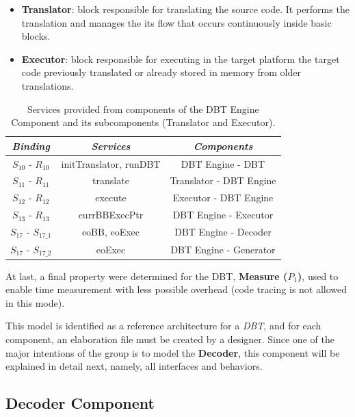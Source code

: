 \documentclass[12pt]{article}
\begin{document}
{\begin{itemize}
\begin{itemize}
\item \textbf{Translator}: block responsible for translating the source code. It performs the translation and manages the its flow that occurs continuously inside basic blocks. 
\item \textbf{Executor}: block responsible for executing in the target platform the target code previously translated or already stored in memory from older translations. 
\end{itemize}
\end{itemize}

\begin{table}[!htb]
\centering
\caption{Services provided from components of the DBT Engine Component and its subcomponents (Translator and Executor).}
\label{tab:dbtenginetable}
\begin{tabular}{|c|c|c|}
\hline
\textit{\textbf{Binding}}  & \textit{\textbf{Services}}    &  \textit{\textbf{Components}}    \\ \hline
$S_{10}$ - $R_{10}$   &  initTranslator, runDBT  & DBT Engine - DBT  \\ \hline
$S_{11}$ - $R_{11}$  & translate   & Translator - DBT Engine \\ \hline
$S_{12}$ - $R_{12}$  & execute   & Executor - DBT Engine \\ \hline
$S_{13}$ - $R_{13}$  & currBBExecPtr & DBT Engine - Executor
\\ \hline
$S_{17}$ - $S_{17\_1}$  & eoBB, eoExec & DBT Engine -  Decoder  \\ \hline
$S_{17}$ - $S_{17\_2}$  & eoExec & DBT Engine - Generator \\ \hline
\end{tabular}
\end{table}

At last, a final property were determined for the DBT, \textbf{Measure ($P_1$)}, used to enable time measurement with less possible overhead (code tracing is not allowed in this mode).


This model is identified as a reference architecture for a \textit{DBT}, and for each component, an elaboration file must be created by a designer. Since one of the major intentions of the group is to model the \textbf{Decoder}, this component will be explained in detail next, namely, all interfaces and behaviors.  



\subsection{Decoder Component}

}
\end{document}
